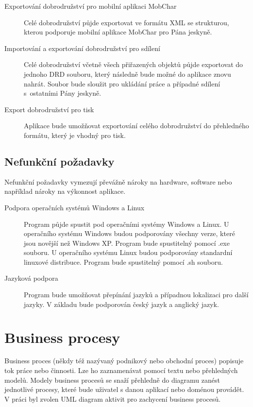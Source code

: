 \documentclass[thesis=B,czech]{resources/FITthesis}[2012/06/26]
\begin{document}
\begin{description}
\item[Exportování dobrodružství pro mobilní aplikaci MobChar] Celé dobrodružství půjde exportovat ve formátu XML se strukturou, kterou podporuje mobilní aplikace MobChar pro Pána jeskyně.

\item[Importování a exportování dobrodružství pro sdílení] Celé dobrodružství včetně všech přiřazených objektů půjde exportovat do jednoho DRD souboru, který následně bude možné do aplikace znovu nahrát. Soubor bude sloužit pro ukládání práce a případné sdílení s~ostatními Pány jeskyně.

\item[Export dobrodružství pro tisk] Aplikace bude umožňovat exportování celého dobrodružství do přehledného formátu, který je vhodný pro tisk. 
\end{description}

\subsection{Nefunkční požadavky}\label{sec:nefunkcni_pozadavky}
Nefunkční požadavky vymezují převážně nároky na hardware, software nebo například nároky na výkonnost aplikace. 
\begin{description}
\item[Podpora operačních systémů Windows a Linux] Program půjde spustit pod operačními systémy Windows a Linux. U operačního systému Windows budou podporovány všechny verze, které jsou novější než Windows XP. Program bude spustitelný pomocí .exe souboru. U operačního systému Linux budou podporovány standardní linuxové distribuce. Program bude spustitelný pomocí .sh souboru.

\item[Jazyková podpora] Program bude umožňovat přepínání jazyků a případnou lokalizaci pro další jazyky. V základu bude podporován český jazyk a anglický jazyk.
\end{description}
	\section{Business procesy}
Business proces (někdy též nazývaný podnikový nebo obchodní proces) popisuje tok práce nebo činnosti. Lze ho zaznamenávat pomocí textu nebo přehledných modelů. Modely business procesů se snaží přehledně do diagramu zanést jednotlivé procesy, které bude uživatel s danou aplikací nebo doménou provádět. V práci byl zvolen UML diagram aktivit pro zachycení business procesů.
\end{document}
